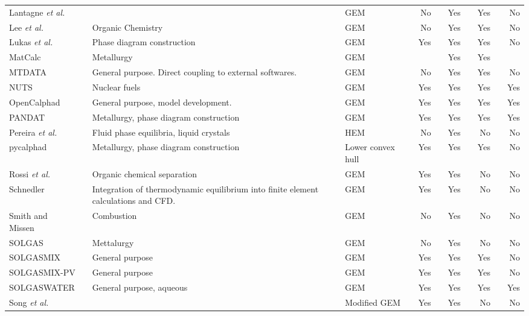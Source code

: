 \begin{landscape}
\begin{longtable}{@{}p{}cp{}clcrcrcrcr@{}}
		Lantagne \textit{et al.} \cite{LANTAGNE1988589} && {} && {GEM} && No && Yes && Yes && No\\
		Lee \textit{et al.} \cite{PENGLEE19991183} && {Organic Chemistry} && {GEM} && No && Yes && Yes && No\\
		Lukas \textit{et al.} \cite{Lukas77} && {Phase diagram construction} && {GEM} && Yes && Yes && Yes && No\\
		MatCalc && {Metallurgy} \cite{Kozeschnik:2001aa} && {GEM} &&  && Yes && Yes && \\
		MTDATA  \cite{Davies02} && {General purpose. Direct coupling to external softwares.} && {GEM} && No && Yes && Yes && No\\
		NUTS \cite{Loukusa:2014aa} && {Nuclear fuels} && {GEM} && Yes && Yes && Yes && Yes\\
		OpenCalphad \cite{Sundman:2015aa} && {General purpose, model development.} && {GEM} && Yes && Yes && Yes && Yes\\
		PANDAT \cite{Cao09} && {Metallurgy, phase diagram construction} && {GEM} && Yes && Yes && Yes && Yes\\
		Pereira \textit{et al.} \cite{PEREIRA20101} && {Fluid phase equilibria, liquid crystals} && {HEM} && No && Yes && No && No\\ 		
		pycalphad \cite{Otis:2017aa} && {Metallurgy, phase diagram construction} && {Lower convex hull} && Yes && Yes && Yes && No\\
		Rossi \textit{et al.} \cite{ROSSI20111226} && {Organic chemical separation} && GEM && Yes && Yes && No && No\\
		Schnedler \cite{SCHNEDLER1984265} && {Integration of thermodynamic equilibrium into finite element calculations and CFD.} && GEM && Yes && Yes && No && No\\
		Smith and Missen \cite{Smith:1988aa}&& {Combustion} && GEM && No && Yes && No && No\\
		SOLGAS \cite{Eriksson71} && {Mettalurgy} && GEM && No && Yes && No && No\\
		SOLGASMIX \cite{Eriksson:1975aa} &&  {General purpose} && GEM && Yes && Yes && Yes && No\\
		SOLGASMIX-PV \cite{Besmann:1977aa} && {General purpose} && GEM && Yes && Yes && Yes && No\\
		SOLGASWATER \cite{ERIKSSON1979375} && {General purpose, aqueous} && GEM && Yes && Yes && Yes && Yes\\
		Song \textit{et al.} \cite{SONG19912513} && {} && Modified GEM && Yes && Yes && No && No\\

\end{longtable}
\end{landscape}
